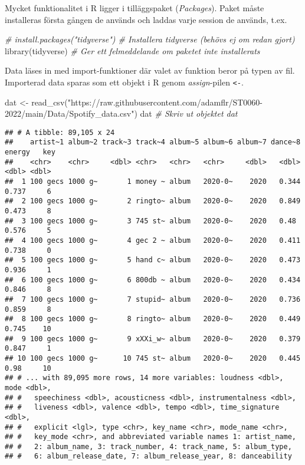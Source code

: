 \documentclass[
]{book}
\newenvironment{Shaded}{\begin{snugshade}}{\end{snugshade}}
\newcommand{\CommentTok}[1]{\textcolor[rgb]{0.56,0.35,0.01}{\textit{#1}}}
\newcommand{\FunctionTok}[1]{\textcolor[rgb]{0.00,0.00,0.00}{#1}}
\newcommand{\NormalTok}[1]{#1}
\newcommand{\OtherTok}[1]{\textcolor[rgb]{0.56,0.35,0.01}{#1}}
\newcommand{\StringTok}[1]{\textcolor[rgb]{0.31,0.60,0.02}{#1}}
\theoremstyle{definition}
\theoremstyle{definition}
\theoremstyle{definition}
\theoremstyle{definition}
\theoremstyle{remark}
\begin{document}
Mycket funktionalitet i R ligger i tilläggspaket (\emph{Packages}). Paket måste installeras första gången de används och laddas varje session de används, t.ex.

\begin{Shaded}
\begin{Highlighting}[]
\CommentTok{\# install.packages("tidyverse")        \# Installera tidyverse (behövs ej om redan gjort)}
\FunctionTok{library}\NormalTok{(tidyverse)                     }\CommentTok{\# Ger ett felmeddelande om paketet inte installerats}
\end{Highlighting}
\end{Shaded}

Data läses in med import-funktioner där valet av funktion beror på typen av fil. Importerad data sparas som ett objekt i R genom \emph{assign}-pilen \texttt{\textless{}-}.

\begin{Shaded}
\begin{Highlighting}[]
\NormalTok{dat }\OtherTok{\textless{}{-}} \FunctionTok{read\_csv}\NormalTok{(}\StringTok{"https://raw.githubusercontent.com/adamflr/ST0060{-}2022/main/Data/Spotify\_data.csv"}\NormalTok{)}
\NormalTok{dat                                              }\CommentTok{\# Skriv ut objektet dat}
\end{Highlighting}
\end{Shaded}

\begin{verbatim}
## # A tibble: 89,105 x 24
##    artist~1 album~2 track~3 track~4 album~5 album~6 album~7 dance~8 energy   key
##    <chr>    <chr>     <dbl> <chr>   <chr>   <chr>     <dbl>   <dbl>  <dbl> <dbl>
##  1 100 gecs 1000 g~       1 money ~ album   2020-0~    2020   0.344  0.737     6
##  2 100 gecs 1000 g~       2 ringto~ album   2020-0~    2020   0.849  0.473     8
##  3 100 gecs 1000 g~       3 745 st~ album   2020-0~    2020   0.48   0.576     5
##  4 100 gecs 1000 g~       4 gec 2 ~ album   2020-0~    2020   0.411  0.738     0
##  5 100 gecs 1000 g~       5 hand c~ album   2020-0~    2020   0.473  0.936     1
##  6 100 gecs 1000 g~       6 800db ~ album   2020-0~    2020   0.434  0.846     8
##  7 100 gecs 1000 g~       7 stupid~ album   2020-0~    2020   0.736  0.859     8
##  8 100 gecs 1000 g~       8 ringto~ album   2020-0~    2020   0.449  0.745    10
##  9 100 gecs 1000 g~       9 xXXi_w~ album   2020-0~    2020   0.379  0.847     1
## 10 100 gecs 1000 g~      10 745 st~ album   2020-0~    2020   0.445  0.98     10
## # ... with 89,095 more rows, 14 more variables: loudness <dbl>, mode <dbl>,
## #   speechiness <dbl>, acousticness <dbl>, instrumentalness <dbl>,
## #   liveness <dbl>, valence <dbl>, tempo <dbl>, time_signature <dbl>,
## #   explicit <lgl>, type <chr>, key_name <chr>, mode_name <chr>,
## #   key_mode <chr>, and abbreviated variable names 1: artist_name,
## #   2: album_name, 3: track_number, 4: track_name, 5: album_type,
## #   6: album_release_date, 7: album_release_year, 8: danceability
\end{verbatim}
\end{document}
